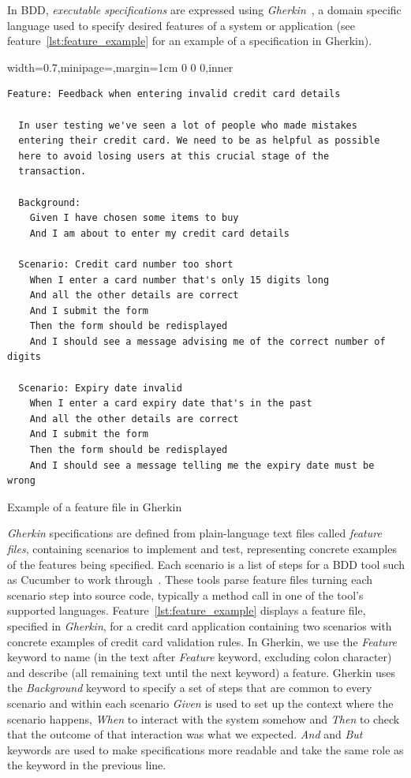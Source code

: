 \documentclass[dissertation,final]{softeng}
\newenvironment{featurecode}[1]
{ \lrbox\featurebox \begin{adjustbox}{width=#1\textwidth,minipage=\textwidth,margin=1cm 0 0 0,inner} }
{ \end{adjustbox}\endlrbox}
\newenvironment{featurelist}[2]
{
\newcommand{\setcaption}{\caption{#1}}
\newcommand{\setlabel}{\label{#2}}
}
{\begin{listing}[h!]\centering\usebox\featurebox\setcaption\setlabel\end{listing}}
\begin{document}
In BDD, \emph{executable specifications} are expressed using \emph{Gherkin}~\citep{wynne2012cucumber}, a domain specific language used to specify desired features of a system or application (see feature~\ref{lst:feature_example} for an example of a specification in Gherkin). 

\begin{featurelist}{Example of a feature file in Gherkin~\citep{wynne2012cucumber}}{lst:feature_example}
\begin{featurecode}{0.7}
\begin{verbatim}
Feature: Feedback when entering invalid credit card details

  In user testing we've seen a lot of people who made mistakes
  entering their credit card. We need to be as helpful as possible
  here to avoid losing users at this crucial stage of the
  transaction.

  Background:
    Given I have chosen some items to buy
    And I am about to enter my credit card details

  Scenario: Credit card number too short
    When I enter a card number that's only 15 digits long
    And all the other details are correct
    And I submit the form
    Then the form should be redisplayed
    And I should see a message advising me of the correct number of digits

  Scenario: Expiry date invalid
    When I enter a card expiry date that's in the past
    And all the other details are correct
    And I submit the form
    Then the form should be redisplayed
    And I should see a message telling me the expiry date must be wrong
\end{verbatim}
\end{featurecode}
\end{featurelist}

\emph{Gherkin} specifications are  defined from plain-language text files called \emph{feature files}, containing scenarios to implement and test, representing concrete examples of the features being specified. Each scenario is a list of steps for a BDD tool such as Cucumber to work through~\citep{wynne2012cucumber}. These tools parse feature files turning each scenario step into source code, typically a method call in one of the tool's supported languages. 
Feature~\ref{lst:feature_example} displays a feature file, specified in \emph{Gherkin}, for a credit card application containing two scenarios with concrete examples of credit card validation rules. In Gherkin, we use the \emph{Feature} keyword to name (in the text after \emph{Feature} keyword, excluding colon character) and describe (all remaining text until the next keyword) a feature. Gherkin uses the \emph{Background} keyword to specify a set of steps that are common to every scenario and within each scenario \emph{Given} is used to set up the context where the scenario happens, \emph{When} to interact with the system somehow and \emph{Then} to check that the outcome of that interaction was what we expected. \emph{And} and \emph{But} keywords are used to make specifications more readable and take the same role as the keyword in the previous line.
\end{document}
